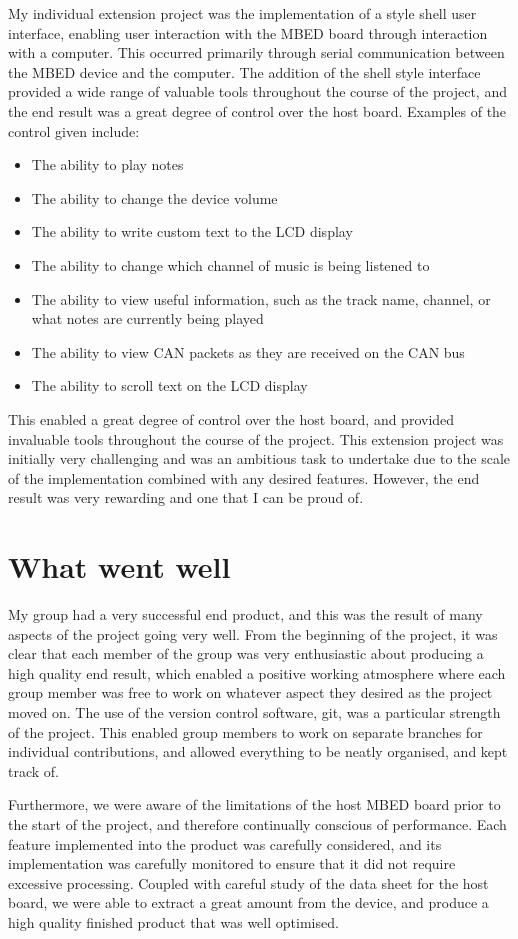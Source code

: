 My individual extension project was the implementation of a style shell user 
interface, enabling user interaction with the MBED board through interaction 
with a computer. This occurred primarily through serial communication between the 
MBED device and the computer. 
The addition of the shell style interface 
provided a wide range of valuable tools throughout the course of the project, 
and the end result was a great degree of control over the 
host board. Examples of the control given include: 
\begin{itemize}
    \item The ability to play notes
    \item The ability to change the device volume
    \item The ability to write custom text to the LCD display 
    \item The ability to change which channel of music is being listened to
    \item The ability to view useful information, such as the track name, channel,
or what notes are currently being played
    \item The ability to view CAN packets as they are received on the CAN bus 
    \item The ability to scroll text on the LCD display 
\end{itemize}
This enabled a great degree of control over the host board, and provided 
invaluable tools throughout the course of the project. This extension project 
was initially very challenging and was an ambitious task to undertake due to the 
scale of the implementation combined with any desired features. However, the end 
result was very rewarding and one that I can be proud of. 

\section{What went well}

My group had a very successful end product, and this was the result of many 
aspects of the project going very well. From the beginning of the project, it was 
clear that each member of the group was very enthusiastic about producing a high 
quality end result, which enabled a positive working atmosphere where each group 
member was free to work on whatever aspect they desired as the project moved on.
The use of the version control software, git, was a particular strength of the 
project. This enabled group members to work on separate branches for individual 
contributions, and allowed everything to be neatly organised, and kept track of. 
\par\bigskip\noindent
Furthermore, we were aware of the limitations of the host MBED board prior to the 
start of the project, and therefore continually conscious of performance. Each 
feature implemented into the product was carefully considered, and its 
implementation was carefully monitored to ensure that it did not require excessive 
processing. Coupled with careful study of the data sheet for the host board, we 
were able to extract a great amount from the device, and produce a high quality 
finished product that was well optimised. 

